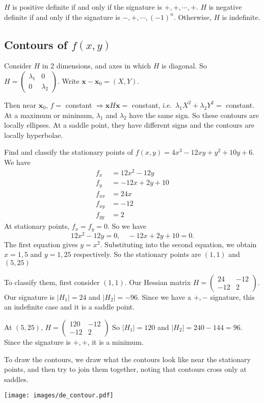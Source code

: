 \documentclass[a4paper]{article}
\begin{document}
\begin{prop}
  $H$ is positive definite if and only if the signature is $+, +, \cdots, +$. $H$ is negative definite if and only if the signature is $-, +, \cdots, (-1)^n$. Otherwise, $H$ is indefinite.
\end{prop}

\subsection{Contours of \texorpdfstring{$f(x, y)$}{f(x, y)}}
Consider $H$ in 2 dimensions, and axes in which $H$ is diagonal. So $H =
\begin{pmatrix}
  \lambda_1 & 0\\
  0 & \lambda_2
\end{pmatrix}$. Write $\mathbf{x} - \mathbf{x}_0 = (X, Y)$.

Then near $\mathbf{x}_0$, $f = $ constant $\Rightarrow \mathbf{x}H\mathbf{x} = $ constant, i.e.\ $\lambda_1 X^2 + \lambda_2 Y^2 = $ constant. At a maximum or minimum, $\lambda_1$ and $\lambda_2$ have the same sign. So these contours are locally ellipses. At a saddle point, they have different signs and the contours are locally hyperbolae.

\begin{eg}
  Find and classify the stationary points of $f(x, y) = 4x^3 - 12xy + y^2 + 10y + 6$. We have
  \begin{align*}
    f_x &= 12x^2 - 12y\\
    f_y &= -12x + 2y + 10\\
    f_{xx} &= 24x\\
    f_{xy} &= -12\\
    f_{yy} &= 2
  \end{align*}
  At stationary points, $f_x = f_y = 0$. So we have
  \[
    12x^2 - 12y = 0,\quad -12x + 2y + 10 = 0.
  \]
  The first equation gives $y = x^2$. Substituting into the second equation, we obtain $x = 1, 5$ and $y = 1, 25$ respectively. So the stationary points are $(1, 1)$ and $(5, 25)$

  To classify them, first consider $(1, 1)$. Our Hessian matrix $H =
  \begin{pmatrix}
    24 & -12\\
    -12 & 2
  \end{pmatrix}$. Our signature is $|H_1| = 24$ and $|H_2| = -96$. Since we have a $+, -$ signature, this an indefinite case and it is a saddle point.

  At $(5, 25)$, $H =
  \begin{pmatrix}
    120 & -12\\
    -12 & 2
  \end{pmatrix}$
  So $|H_1| = 120$ and $|H_2| = 240 - 144 = 96$. Since the signature is $+, +$, it is a minimum.

  To draw the contours, we draw what the contours look like near the stationary points, and then try to join them together, noting that contours cross only at saddles.
  \begin{center}
    \texttt{[image: images/de\_contour.pdf]}
  \end{center}
\end{eg}
\end{document}
